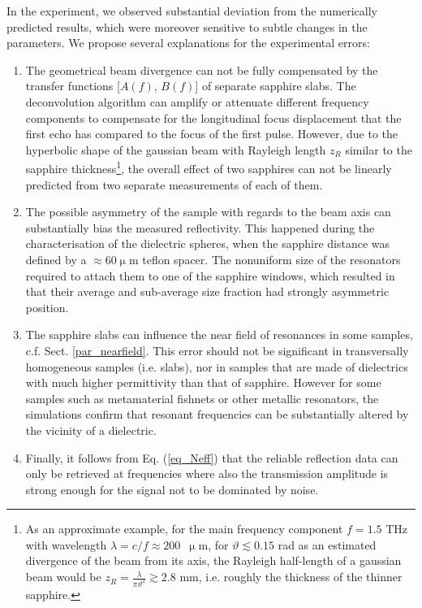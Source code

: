 In the experiment, we observed substantial deviation  %
from the numerically predicted results, which were moreover sensitive to subtle changes in the parameters. We propose  several explanations for the experimental errors:
\begin{enumerate}
\item{The geometrical beam divergence can not be fully compensated by the transfer functions [$A(f)$, $B(f)$] of separate sapphire slabs. The deconvolution algorithm can amplify or attenuate different frequency components to compensate for the  longitudinal focus displacement that the first echo has compared to the focus of the first pulse. However, due to the hyperbolic shape of the gaussian beam with Rayleigh length $z_{R}$ similar to the sapphire thickness\footnote{As an approximate example, for the main frequency component $f = 1.5$ THz with wavelength $\lambda = c / f \approx 200$~$\upmu$m, for $\vartheta \lesssim 0.15$ rad as an estimated divergence of the beam from its axis, the Rayleigh half-length of a gaussian beam would be $z_{R} = \frac{\lambda}{\pi \vartheta^{2}} \gtrsim 2.8$ mm, i.e. roughly the thickness of the thinner sapphire.}, the overall effect of two sapphires can not be linearly predicted from two separate measurements of each of them.} 
 \item{The possible asymmetry of the sample with regards to the beam axis can substantially bias the measured reflectivity. This happened during the characterisation of the dielectric spheres, when the sapphire distance was defined by a $\approx$60$\upmu$m teflon spacer. The nonuniform size of the resonators required to attach them to one of the sapphire windows, which resulted in that their average and sub-average size fraction had strongly asymmetric position. } 
 \item{The sapphire slabs can influence the near field of resonances in some samples, c.f. Sect. \ref{par_nearfield}. This error should not be significant in transversally homogeneous samples (i.e. slabs), nor in samples that are made of dielectrics with much higher permittivity than that of sapphire. However for some samples such as metamaterial fishnets or other metallic resonators, the simulations confirm that resonant frequencies can be substantially altered by the vicinity of a dielectric. }
 \item{Finally, it follows from Eq. (\ref{eq_Neff})
 that the reliable reflection data can only be retrieved at frequencies where also the transmission amplitude is strong enough for the signal not to be dominated by noise. }
 \end{enumerate}


